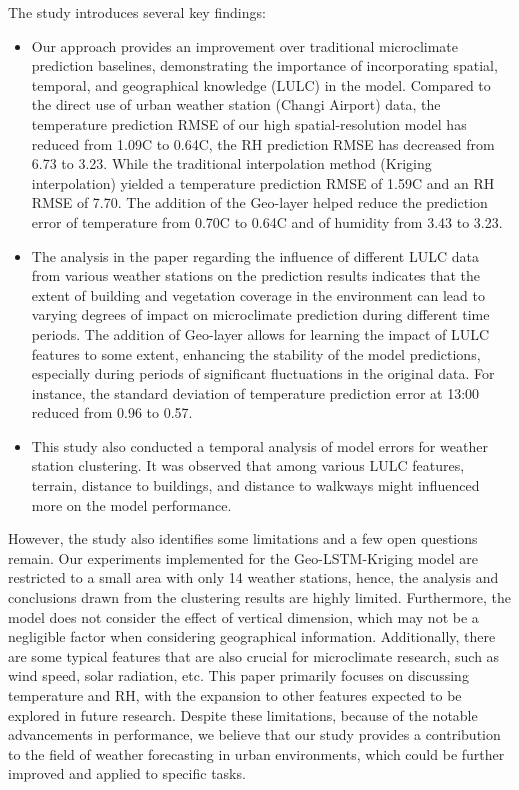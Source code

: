 \documentclass[a4paper,fleqn]{cas-sc}
\begin{document}
The study introduces several key findings:
\begin{itemize}
    \item Our approach provides an improvement over traditional microclimate prediction baselines, demonstrating the importance of incorporating spatial, temporal, and geographical knowledge (LULC) in the model. Compared to the direct use of urban weather station (Changi Airport) data, the temperature prediction RMSE of our high spatial-resolution model has reduced from 1.09\textdegree C to 0.64\textdegree C, the RH prediction RMSE has decreased from 6.73 to 3.23. While the traditional interpolation method (Kriging interpolation) yielded a temperature prediction RMSE of 1.59\textdegree C and an RH RMSE of 7.70. The addition of the Geo-layer helped reduce the prediction error of temperature from 0.70\textdegree C to 0.64\textdegree C and of humidity from 3.43 to 3.23.

    \item The analysis in the paper regarding the influence of different LULC data from various weather stations on the prediction results indicates that the extent of building and vegetation coverage in the environment can lead to varying degrees of impact on microclimate prediction during different time periods. The addition of Geo-layer allows for learning the impact of LULC features to some extent, enhancing the stability of the model predictions, especially during periods of significant fluctuations in the original data. For instance, the standard deviation of temperature prediction error at 13:00 reduced from 0.96 to 0.57.

    \item This study also conducted a temporal analysis of model errors for weather station clustering. It was observed that among various LULC features, terrain, distance to buildings, and distance to walkways might influenced more on the model performance.
    
\end{itemize} 

However, the study also identifies some limitations and a few open questions remain. Our experiments implemented for the Geo-LSTM-Kriging model are restricted to a small area with only 14 weather stations, hence, the analysis and conclusions drawn from the clustering results are highly limited. Furthermore, the model does not consider the effect of vertical dimension, which may not be a negligible factor when considering geographical information. Additionally, there are some typical features that are also crucial for microclimate research, such as wind speed, solar radiation, etc. This paper primarily focuses on discussing temperature and RH, with the expansion to other features expected to be explored in future research. Despite these limitations, because of the notable advancements in performance, we believe that our study provides a contribution to the field of weather forecasting in urban environments, which could be further improved and applied to specific tasks.
\end{document}
